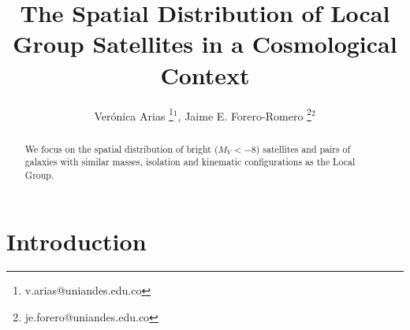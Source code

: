 \documentclass{emulateapj}
\begin{document}
\title{The Spatial Distribution of Local Group Satellites in a
  Cosmological Context}  
\author{
  Ver\'onica Arias \thanks{v.arias@uniandes.edu.co}$^{1}$,
  Jaime E. Forero-Romero \thanks{je.forero@uniandes.edu.co}$^{2}$ 
}


\begin{abstract}
We focus on the spatial distribution of bright ($M_V<-8$) satellites and
pairs of galaxies with similar masses, isolation and kinematic
configurations as the Local Group. 
\end{abstract}


\section{Introduction}

%
%
%
%
%
%
%
%
%
% 
\end{document}
